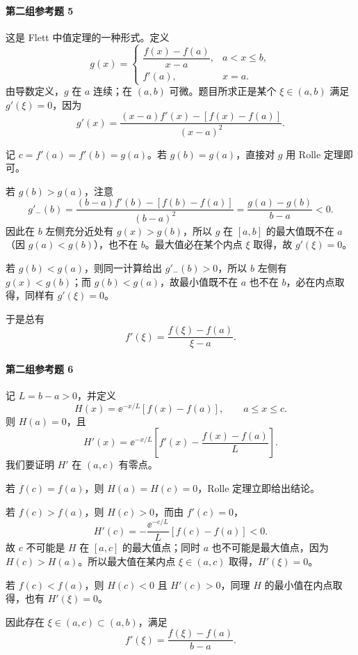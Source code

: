 \paragraph{第二组参考题 5}
\begin{xsolution}
这是 Flett 中值定理的一种形式。定义
\[
  g(x)=
  \begin{cases}
    \dfrac{f(x)-f(a)}{x-a},&a<x\leqslant b,\\[1ex]
    f'(a),&x=a.
  \end{cases}
\]
由导数定义，$g$ 在 $a$ 连续；在 $(a,b)$ 可微。题目所求正是某个 $\xi\in(a,b)$ 满足 $g'(\xi)=0$，因为
\[
  g'(x)=\frac{(x-a)f'(x)-[f(x)-f(a)]}{(x-a)^2}.
\]

记 $c=f'(a)=f'(b)=g(a)$。若 $g(b)=g(a)$，直接对 $g$ 用 Rolle 定理即可。

若 $g(b)>g(a)$，注意
\[
  g'_-(b)
  =\frac{(b-a)f'(b)-[f(b)-f(a)]}{(b-a)^2}
  =\frac{g(a)-g(b)}{b-a}<0.
\]
因此在 $b$ 左侧充分近处有 $g(x)>g(b)$，所以 $g$ 在 $[a,b]$ 的最大值既不在 $a$（因 $g(a)<g(b)$），也不在 $b$。最大值必在某个内点 $\xi$ 取得，故 $g'(\xi)=0$。

若 $g(b)<g(a)$，则同一计算给出 $g'_-(b)>0$，所以 $b$ 左侧有 $g(x)<g(b)$；而 $g(b)<g(a)$，故最小值既不在 $a$ 也不在 $b$，必在内点取得，同样有 $g'(\xi)=0$。

于是总有
\[
  f'(\xi)=\frac{f(\xi)-f(a)}{\xi-a}.
\]
\end{xsolution}

\paragraph{第二组参考题 6}
\begin{xsolution}
记 $L=b-a>0$，并定义
\[
  H(x)=\ee^{-x/L}[f(x)-f(a)],\qquad a\leqslant x\leqslant c.
\]
则 $H(a)=0$，且
\[
  H'(x)=\ee^{-x/L}
  \left[f'(x)-\frac{f(x)-f(a)}L\right].
\]
我们要证明 $H'$ 在 $(a,c)$ 有零点。

若 $f(c)=f(a)$，则 $H(a)=H(c)=0$，Rolle 定理立即给出结论。

若 $f(c)>f(a)$，则 $H(c)>0$，而由 $f'(c)=0$，
\[
  H'(c)=-\frac{\ee^{-c/L}}L[f(c)-f(a)]<0.
\]
故 $c$ 不可能是 $H$ 在 $[a,c]$ 的最大值点；同时 $a$ 也不可能是最大值点，因为 $H(c)>H(a)$。所以最大值在某内点 $\xi\in(a,c)$ 取得，$H'(\xi)=0$。

若 $f(c)<f(a)$，则 $H(c)<0$ 且 $H'(c)>0$，同理 $H$ 的最小值在内点取得，也有 $H'(\xi)=0$。

因此存在 $\xi\in(a,c)\subset(a,b)$，满足
\[
  f'(\xi)=\frac{f(\xi)-f(a)}{b-a}.
\]
\end{xsolution}

